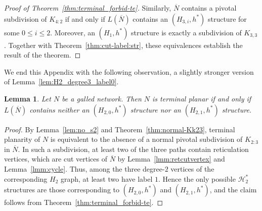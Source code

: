 \documentclass[pdflatex,sn-mathphys-num]{sn-jnl}
\theoremstyle{thmstyleone}%
\theoremstyle{thmstyletwo}%
\newtheorem{lemma}{Lemma}
\theoremstyle{thmstylethree}%
\begin{document}
\begin{appendices}
\begin{proof}[Proof of Theorem~\ref{thm:terminal_forbid-te}]
Similarly, $\overline N$ contains a pivotal subdivision of $K_{4:2}$ if and only if $L(\overline N)$ contains an $(H_{3,i},h^*)$ structure for some $0\le i\le 2$. Moreover, an $(H_1,h^*)$ structure is exactly a subdivision of $K_{3,3}$.
Together with Theorem~\ref{thm:cut-label:str}, these equivalences establish the result of the theorem. 
\end{proof}

We end this Appendix with the following observation, a slightly stronger version of Lemma~\ref{lem:H2_degree3_label0}.

\begin{lemma}\label{lem:galled_H20_H21}
Let $N$ be a galled network. Then $N$ is terminal planar if and only if $L(\overline N)$ contains neither an $(H_{2,0},h^*)$ structure nor an $(H_{2,1},h^*)$ structure.
\end{lemma}

\begin{proof}
By Lemma~\ref{lem:no_s2} and Theorem~\ref{thm:normal-Kk23}, terminal planarity of $N$ is equivalent to the absence of a normal pivotal subdivision of $K_{2:3}$ in $\overline N$. In such a subdivision, at
least two of the three paths contain reticulation vertices, which are cut vertices of $\overline N$ by Lemma~\ref{lmm:retcutvertex} and Lemma~\ref{lmm:cycle}.
Thus, among the three degree-$2$ vertices of the corresponding $H_2$ graph, at least two have label $1$. Hence the only possible $\mathcal H_2^*$ structures are those corresponding to
$(H_{2,0},h^*)$ and $(H_{2,1},h^*)$, and the claim follows from Theorem~\ref{thm:terminal_forbid-te}.
\end{proof}


\end{appendices}
\end{document}
